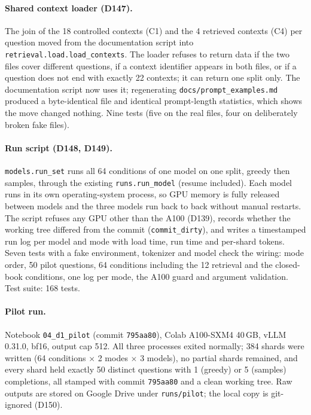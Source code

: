 \documentclass[11pt,a4paper]{report}
\begin{document}
\paragraph{Shared context loader (D147).}
The join of the 18 controlled contexts (C1) and the 4 retrieved contexts
(C4) per question moved from the documentation script into
\texttt{retrieval.load.load\_contexts}. The loader refuses to return data if
the two files cover different questions, if a context identifier appears in
both files, or if a question does not end with exactly 22 contexts; it can
return one split only. The documentation script now uses it; regenerating
\texttt{docs/prompt\_examples.md} produced a byte-identical file and
identical prompt-length statistics, which shows the move changed nothing.
Nine tests (five on the real files, four on deliberately broken fake files).

\paragraph{Run script (D148, D149).}
\texttt{models.run\_set} runs all 64 conditions of one model on one split,
greedy then samples, through the existing \texttt{runs.run\_model} (resume
included). Each model runs in its own operating-system process, so GPU memory
is fully released between models and the three models run back to back
without manual restarts. The script refuses any GPU other than the A100
(D139), records whether the working tree differed from the commit
(\texttt{commit\_dirty}), and writes a timestamped run log per model and mode
with load time, run time and per-shard tokens. Seven tests with a fake
environment, tokenizer and model check the wiring: mode order, 50 pilot
questions, 64 conditions including the 12 retrieval and the closed-book
conditions, one log per mode, the A100 guard and argument validation.
Test suite: 168 tests.

\paragraph{Pilot run.}
Notebook \texttt{04\_d1\_pilot} (commit \texttt{795aa80}), Colab A100-SXM4
40\,GB, vLLM 0.31.0, bf16, output cap 512. All three processes exited
normally; 384 shards were written (64 conditions $\times$ 2 modes $\times$
3 models), no partial shards remained, and every shard held exactly 50
distinct questions with 1 (greedy) or 5 (samples) completions, all stamped
with commit \texttt{795aa80} and a clean working tree. Raw outputs are stored
on Google Drive under \texttt{runs/pilot}; the local copy is git-ignored
(D150).
\end{document}
